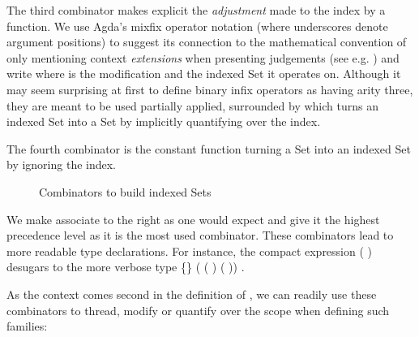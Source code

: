 The third combinator  makes explicit the \emph{adjustment} made to the index
by a function. We use Agda's mixfix operator notation (where underscores denote argument
positions) to suggest its connection to the mathematical convention of only mentioning
context \emph{extensions} when presenting judgements (see e.g. \cite{martin1982constructive})
and write    where  is the modification and  the indexed
Set it operates on. Although it may seem surprising at first to define binary
infix operators as having arity three, they are meant to be used partially applied,
surrounded by \AF{[\_]} which turns an indexed Set into a Set by implicitly
quantifying over the index.

The fourth combinator  is the constant function turning a Set into an indexed Set
by ignoring the index.

\begin{figure}[h]
\begin{minipage}{0.45\textwidth}
\end{minipage}\hspace{2em}
\begin{minipage}{0.45\textwidth}
\end{minipage}

\begin{minipage}{0.40\textwidth}
\end{minipage}\hspace{2em}
\begin{minipage}{0.25\textwidth}
\end{minipage}
\begin{minipage}{0.25\textwidth}
\end{minipage}
\caption{Combinators to build indexed Sets}\label{figure:indexed}
\end{figure}

We make  associate to the right as one would expect and give it the
highest precedence level as it is the most used combinator. These combinators
lead to more readable type declarations.  For instance, the compact expression
\AF{[}   (  )   \AF{]}
desugars to the more verbose type
 \{\}  ( ( )   ( ))   .

As the context comes second in the definition of , we
can readily use these combinators to thread, modify or quantify over the
scope when defining such families:

